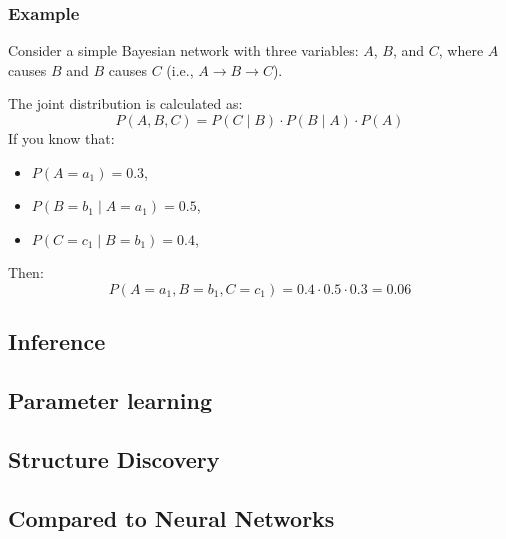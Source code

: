\subsubsection{Example}
Consider a simple Bayesian network with three variables: $A$, $B$, and $C$, where $A$ causes $B$ and $B$ causes $C$ (i.e., $A \rightarrow B \rightarrow C$).

The joint distribution is calculated as:
\[
P(A, B, C) = P(C \mid B) \cdot P(B \mid A) \cdot P(A)
\]
If you know that:
\begin{itemize}
    \item $P(A = a_1) = 0.3$,
    \item $P(B = b_1 \mid A = a_1) = 0.5$,
    \item $P(C = c_1 \mid B = b_1) = 0.4$,
\end{itemize}
Then:
\[
P(A = a_1, B = b_1, C = c_1) = 0.4 \cdot 0.5 \cdot 0.3 = 0.06
\]

\subsection{Inference}
\subsection{Parameter learning}
\subsection{Structure Discovery}
\subsection{Compared to Neural Networks}